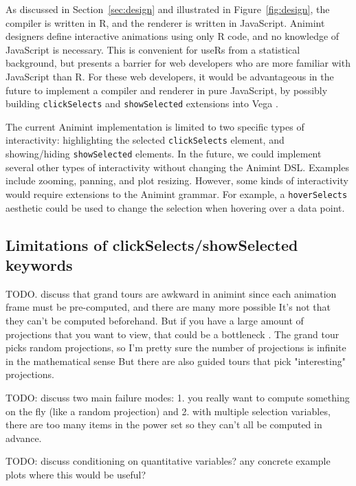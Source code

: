 \documentclass[10pt,journal,compsoc]{IEEEtran}\usepackage[]{graphicx}\usepackage[]{color}
\begin{document}
As discussed in Section~\ref{sec:design} and illustrated in
Figure~\ref{fig:design}, the compiler is written in R, and the
renderer is written in JavaScript.
Animint designers define interactive animations using only R code, and
no knowledge of JavaScript is necessary. This is convenient for useRs
from a statistical background, but presents a barrier for web
developers who are more familiar with JavaScript than R. For these web
developers, it would be advantageous in the future to implement a
compiler and renderer in pure JavaScript, by possibly building
\texttt{clickSelects} and \texttt{showSelected} extensions into Vega
\citep{vega}.

The current Animint implementation is limited to two specific types of
interactivity: highlighting the selected \texttt{clickSelects}
element, and showing/hiding \texttt{showSelected} elements. In the
future, we could implement several other types of interactivity
without changing the Animint DSL. Examples include zooming,
panning, and plot resizing. However, some
kinds of interactivity would require extensions to the Animint
grammar. For example, a \texttt{hoverSelects} aesthetic
could be used to change the selection when hovering over a data point.

\subsection{Limitations of clickSelects/showSelected keywords}

TODO. discuss that grand tours are awkward in animint since each
animation frame must be pre-computed, and there are many more possible
It's not that they can't be computed beforehand. But if you have a
large amount of projections that you want to view, that could be a
bottleneck \citep{tourr}. The grand tour picks random projections, so
I'm pretty sure the number of projections is infinite in the
mathematical sense But there are also guided tours that pick
"interesting" projections.

TODO: discuss two main failure modes: 1. you really want to compute
something on the fly (like a random projection) and 2. with multiple
selection variables, there are too many items in the power set so they
can't all be computed in advance.

TODO: discuss conditioning on quantitative variables? any concrete
example plots where this would be useful? 
\end{document}
